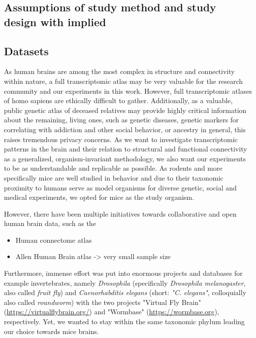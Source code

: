 \documentclass[]{article}
\renewcommand{\cite}{\citep}
\begin{document}
\subsection*{Assumptions of study method and study design with implied }

\subsection{Datasets}
\label{sec:datasets}
As human brains are among the most complex in structure and connectivity within nature, a full transcriptomic atlas may be very valuable for the research community and our experiments in this work. However, full transcriptomic atlases of homo sapiens are ethically difficult to gather. Additionally, as a valuable, public genetic atlas of deceased relatives may provide highly critical information about the remaining, living ones, such as genetic diseases, genetic markers for correlating with addiction and other social behavior, or ancestry in general, this raises tremendous privacy concerns. As we want to investigate transcriptomic patterns in the brain and their relation to structural and functional connectivity as a generalized, organism-invariant methodology, we also want our experiments to be as understandable and replicable as possible. As rodents and more specifically mice are well studied in behavior and due to their taxonomic proximity to humans serve as model organisms for diverse genetic, social and medical experiments, we opted for mice as the study organism.

However, there have been multiple initiatives towards collaborative and open human brain data, such as the 
\begin{itemize}
	\item Human connectome atlas
	\item Allen Human Brain atlas -> very small sample size
\end{itemize}
Furthermore, immense effort was put into enormous projects and databases for example invertebrates, namely \textit{Drosophila} (specifically \textit{Drosophila melanogaster}, also called \textit{fruit fly}) and \textit{Caenorhabditis elegans} (short: \textit{"C. elegans"}, colloquially also called \textit{roundworm}) with the two projects "Virtual Fly Brain" \cite{milyaev2012virtual} (\href{https://virtualflybrain.org/}{https://virtualflybrain.org/}) and "Wormbase" \cite{lee2003building, davis2022wormbase} (\href{https://wormbase.org}{https://wormbase.org}), respectively. Yet, we wanted to stay within the same taxonomic phylum leading our choice towards mice brains. 
\end{document}
